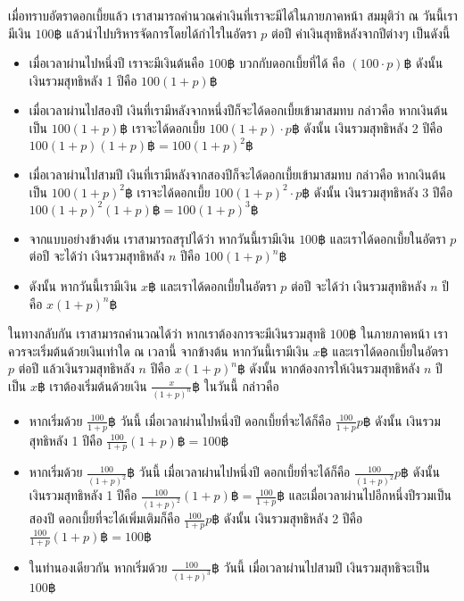 เมื่อทราบอัตราดอกเบี้ยแล้ว เราสามารถคำนวณค่าเงินที่เราจะมีได้ในภายภาคหน้า \enskip สมมุติว่า ณ วันนี้เรามีเงิน $100฿$ แล้วนำไปบริหารจัดการโดยได้กำไรในอัตรา $p$ ต่อปี \enskip ค่าเงินสุทธิหลังจากปีต่างๆ เป็นดังนี้
\begin{itemize}
\item เมื่อเวลาผ่านไปหนึ่งปี เราจะมีเงินต้นคือ $100฿$ บวกกับดอกเบี้ยที่ได้ คือ $(100\cdot p)฿$ \enskip ดังนั้น เงินรวมสุทธิหลัง 1 ปีคือ $100(1+p)฿$
\item เมื่อเวลาผ่านไปสองปี เงินที่เรามีหลังจากหนึ่งปีก็จะได้ดอกเบี้ยเข้ามาสมทบ กล่าวคือ หากเงินต้นเป็น $100(1+p)฿$ เราจะได้ดอกเบี้ย $100(1+p)\cdot p฿$ \enskip ดังนั้น เงินรวมสุทธิหลัง 2 ปีคือ $100(1+p)(1+p)฿=100(1+p)^2฿$
\item เมื่อเวลาผ่านไปสามปี เงินที่เรามีหลังจากสองปีก็จะได้ดอกเบี้ยเข้ามาสมทบ กล่าวคือ หากเงินต้นเป็น $100(1+p)^2 ฿$ เราจะได้ดอกเบี้ย $100(1+p)^2\cdot p ฿$ \enskip ดังนั้น เงินรวมสุทธิหลัง 3 ปีคือ $100(1+p)^2(1+p)฿=100(1+p)^3฿$
\item จากแบบอย่างข้างต้น เราสามารถสรุปได้ว่า หากวันนี้เรามีเงิน $100฿$ และเราได้ดอกเบี้ยในอัตรา $p$ ต่อปี จะได้ว่า เงินรวมสุทธิหลัง $n$ ปีคือ $100(1+p)^n฿$
\item ดังนั้น หากวันนี้เรามีเงิน $x฿$ และเราได้ดอกเบี้ยในอัตรา $p$ ต่อปี จะได้ว่า เงินรวมสุทธิหลัง $n$ ปีคือ $x(1+p)^n฿$
\end{itemize}
ในทางกลับกัน เราสามารถคำนวณได้ว่า หากเราต้องการจะมีเงินรวมสุทธิ $100฿$ ในภายภาคหน้า เราควรจะเริ่มต้นด้วยเงินเท่าใด ณ เวลานี้ \enskip จากข้างต้น หากวันนี้เรามีเงิน $x฿$ และเราได้ดอกเบี้ยในอัตรา $p$ ต่อปี แล้วเงินรวมสุทธิหลัง $n$ ปีคือ $x(1+p)^n฿$ \enskip ดังนั้น หากต้องการให้เงินรวมสุทธิหลัง $n$ ปีเป็น $x฿$ เราต้องเริ่มต้นด้วยเงิน $\frac{x}{(1+p)^n}฿$ ในวันนี้ กล่าวคือ
\begin{itemize}
\item หากเริ่มด้วย $\frac{100}{1+p}฿$ วันนี้ เมื่อเวลาผ่านไปหนึ่งปี ดอกเบี้ยที่จะได้ก็คือ $\frac{100}{1+p}p฿$ ดังนั้น เงินรวมสุทธิหลัง 1 ปีคือ $\frac{100}{1+p}(1+p)฿=100฿$
\item หากเริ่มด้วย $\frac{100}{(1+p)^2}฿$ วันนี้ เมื่อเวลาผ่านไปหนึ่งปี ดอกเบี้ยที่จะได้ก็คือ $\frac{100}{(1+p)^2}p฿$ ดังนั้น เงินรวมสุทธิหลัง 1 ปีคือ $\frac{100}{(1+p)^2}(1+p)฿=\frac{100}{1+p}฿$ \enskip และเมื่อเวลาผ่านไปอีกหนึ่งปีรวมเป็นสองปี ดอกเบี้ยที่จะได้เพิ่มเติมก็คือ $\frac{100}{1+p}p฿$ ดังนั้น เงินรวมสุทธิหลัง 2 ปีคือ $\frac{100}{1+p}(1+p)฿=100฿$
\item ในทำนองเดียวกัน หากเริ่มด้วย $\frac{100}{(1+p)^3}฿$ วันนี้ เมื่อเวลาผ่านไปสามปี เงินรวมสุทธิจะเป็น $100฿$
\end{itemize}
